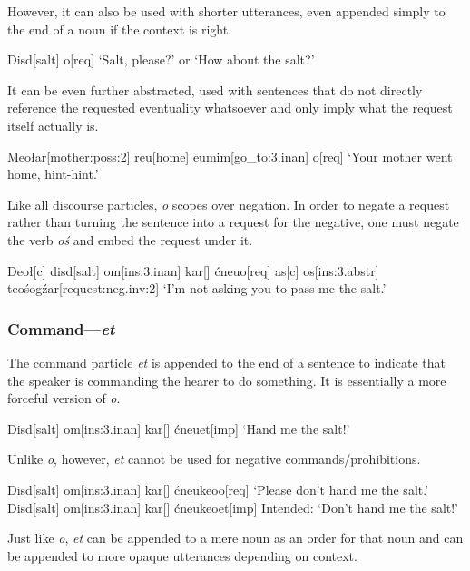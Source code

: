 \documentclass[a4paper,11pt,oneside,openany]{memoir}
\begin{document}
However, it can also be used with shorter utterances, even appended simply to the end of a noun if the context is right.

\ex
\begingl
Disd[salt]
\vr o[\sc req]
\glft `Salt, please?' or `How about the salt?'
\endgl
\xe

It can be even further abstracted, used with sentences that do not directly reference the requested eventuality whatsoever and only imply what the request itself actually is.

\ex
\begingl
Meo\l ar[mother:{\sc poss:2}]
reu[home]
eumim[go\_to:{\sc 3.inan}]
\vr o[\sc req]
\glft `Your mother went home, hint-hint.'
\endgl
\xe

Like all discourse particles, \textit{\vr o} scopes over negation. In order to negate a request rather than turning the sentence into a request for the negative, one must negate the verb \textit{\vr o\'s} and embed the request under it.

\ex
\begingl
Deo\l[\sc c]
disd[salt]
\vc om[\sc ins:3.inan]
kar[]
\'cneu\vd[give:{\sc 1}]
\vr o[\sc req]
\nogloss{,}
as[\sc c]
\vc os[\sc ins:3.abstr]
te\vd[\sc 1]
\vr o\'sog\'zar[request:{\sc neg.inv:2}]
\glft `I'm not asking you to pass me the salt.'
\endgl
\xe

\subsubsection{Command---\textit{\vd et}}

The command particle \textit{\vd et} is appended to the end of a sentence to indicate that the speaker is commanding the hearer to do something. It is essentially a more forceful version of \textit{\vr o}. 

\ex
\begingl
Disd[salt]
\vc om[\sc ins:3.inan]
kar[]
\'cneu\vd[give:{\sc 1}]
\vd et[\sc imp]
\glft `Hand me the salt!'
\endgl
\xe

Unlike \textit{\vr o}, however, \textit{\vd et} cannot be used for negative commands/prohibitions.

\pex 
\a 
\begingl
Disd[salt]
\vc om[\sc ins:3.inan]
kar[]
\'cneukeo
\vr o[\sc req]
\glft `Please don't hand me the salt.'
\endgl
\a \ljudge{\#}
\begingl
Disd[salt]
\vc om[\sc ins:3.inan]
kar[]
\'cneukeo
\vd et[\sc imp]
\glft Intended: `Don't hand me the salt!'
\endgl
\xe

Just like \textit{\vr o}, \textit{\vd et} can be appended to a mere noun as an order for that noun and can be appended to more opaque utterances depending on context. 
\end{document}
